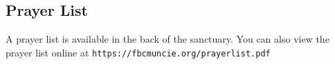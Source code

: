 \vspace{\fill}

\subsection{Prayer List}
\label{prayerlist}

A prayer list is available in the back of the sanctuary. You can also view the prayer list online at  \texttt{https://fbcmuncie.org/prayerlist.pdf}

\vspace{\fill}
